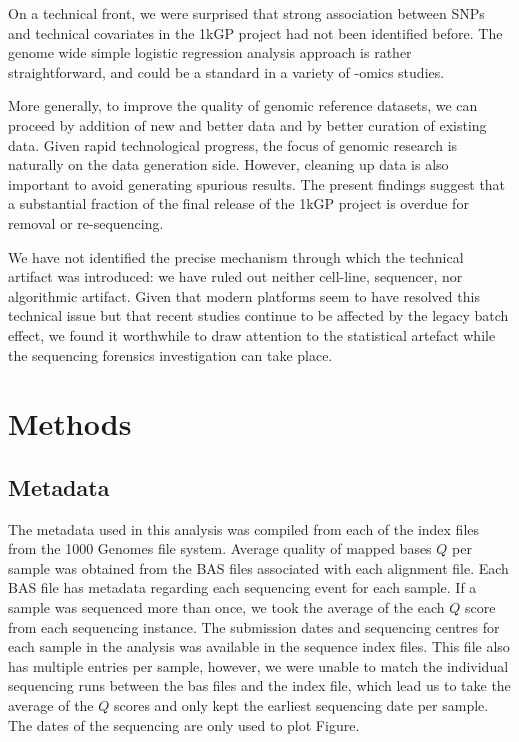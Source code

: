 \documentclass[9pt,lineno]{elife}
\begin{document}
On a technical front, we were surprised that strong association between SNPs and technical covariates in the 1kGP project had not been identified before. 
The genome wide simple logistic regression analysis approach is rather straightforward, and could be a standard in a variety of -omics studies. 

More generally, to improve the quality of genomic reference datasets, we can proceed by addition of new and better data and by better curation of existing data.
Given rapid technological progress, the focus of genomic research is naturally on the data generation side. However, cleaning up data is also important to avoid generating spurious results. 
The present findings suggest that a substantial fraction of the final release of the 1kGP project is overdue for removal or re-sequencing. 

We have not identified the precise mechanism through which the technical artifact was introduced: we have ruled out neither cell-line, sequencer, nor algorithmic artifact. 
Given that modern platforms seem to have resolved this technical issue but that recent studies continue to be affected by the legacy batch effect, we found it worthwhile to draw attention to the statistical artefact while the sequencing forensics investigation can take place.     


\section{Methods}
\subsection{Metadata}
The metadata used in this analysis was compiled from each of the index files from the 1000 Genomes file system. 
Average quality of mapped bases $Q$ per sample was obtained from the BAS files associated with each alignment file. 
Each BAS file has metadata regarding each sequencing event for each sample. 
If a sample was sequenced more than once, we took the average of the each $Q$ score from each sequencing instance. 
The submission dates and sequencing centres for each sample in the analysis was available in the sequence index files.  
This file also has multiple entries per sample, however, we were unable to match the individual sequencing runs between the bas files and the index file, which lead us to take the average of the $Q$ scores and only kept the earliest sequencing date per sample. 
The dates of the sequencing are only used to plot Figure.
\end{document}

